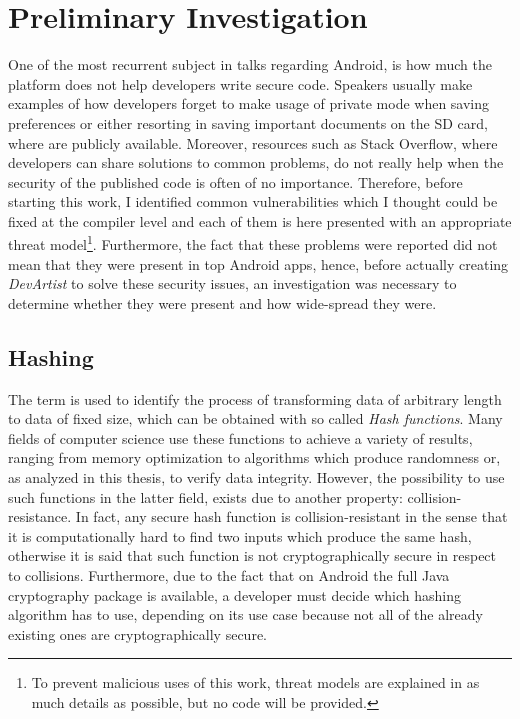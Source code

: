 \chapter{Preliminary Investigation}
\label{ch:investigation}
One of the most recurrent subject in talks regarding Android, is how much the platform does not help developers write secure code. Speakers usually make examples of how developers forget to make usage of private mode when saving preferences or either resorting in saving important documents on the SD card, where are publicly available\cite{codemotion}. Moreover, resources such as Stack Overflow, where developers can share solutions to common problems, do not really help when the security of the published code is often of no importance. Therefore, before starting this work, I identified common vulnerabilities which I thought could be fixed at the compiler level and each of them is here presented with an appropriate threat model\footnote{To prevent malicious uses of this work, threat models are explained in as much details as possible, but no code will be provided.}. Furthermore, the fact that these problems were reported did not mean that they were present in top Android apps, hence, before actually creating \emph{DevArtist} to solve these security issues, an investigation was necessary to determine whether they were present and how wide-spread they were.

\section{Hashing}
The term is used to identify the process of transforming data of arbitrary length to data of fixed size, which can be obtained with so called \emph{Hash functions}. Many fields of computer science use these functions to achieve a variety of results, ranging from memory optimization to algorithms which produce randomness or, as analyzed in this thesis, to verify data integrity. However, the possibility to use such functions in the latter field, exists due to another property: collision-resistance. In fact, any secure hash function is collision-resistant in the sense that it is computationally hard to find two inputs which produce the same hash, otherwise it is said that such function is not cryptographically secure in respect to collisions. Furthermore, due to the fact that on Android the full Java cryptography package is available, a developer must decide which hashing algorithm has to use, depending on its use case because not all of the already existing ones are cryptographically secure.

